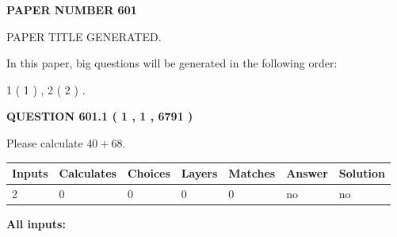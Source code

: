 \documentclass[12pt]{article}
\begin{document}
   
   
   
\newpage 
\setcounter{page}{ 
   601001 } 
   
   
   
   
 {\textbf{ \Large{ PAPER NUMBER  601  }}}
   
   
\vspace{0.2in}
   
   
   
   
   
   
   
   
 \vspace{0.2in}
 
 
 
 
   
   
 PAPER TITLE GENERATED.
   
   
   
\vspace{0.2in}
   
In this paper, big questions will be generated in the following order: 
   
   
   1 ( 1 )
 ,
   2 ( 2 )
 .
  
\vspace{0.2in}
  
{\textbf{\Large{QUESTION
601.1 
 ( 1 , 1 , 6791 )
}}}
  
  
 
Please calculate $ %
40 +  %
68 $.
 
 
   
   
   
   
\noindent\begin{tabular}{|l|l|l|l|l|l|l|}
 \hline
Inputs & Calculates & Choices & Layers & Matches & Answer & Solution \\ \hline
 2  & 
 0  & 
 0
  & 
 0  & 
 0  & 
  no & 
  no 
  \\ \hline
 \end{tabular}
   
   
   
   
\noindent{}
   
   
   
   
\noindent\vspace{0.1in}\hspace{-0.08in} {\textbf{\Large{All inputs: }}}
   
   
  
\end{document}
